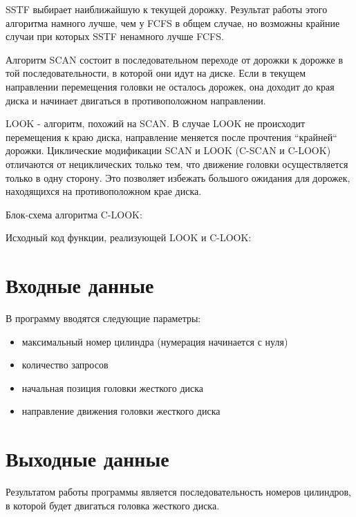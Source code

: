 \documentclass[a4paper,10pt,oneside]{article}
\begin{document}
SSTF выбирает наиближайшую к текущей дорожку. Результат работы этого алгоритма намного лучше, чем у FCFS в общем случае, но возможны крайние случаи при которых
SSTF ненамного лучше FCFS.

Алгоритм SCAN состоит в последовательном переходе от дорожки к дорожке в той последовательности, в которой они идут на диске. Если в текущем направлении перемещения
головки не осталось дорожек, она доходит до края диска и начинает двигаться в противоположном направлении.

LOOK - алгоритм, похожий на SCAN. В случае LOOK не происходит перемещения к краю диска, направление меняется после прочтения ``крайней`` дорожки.
Циклические модификации SCAN и LOOK (C-SCAN и C-LOOK) отличаются от нециклических только тем, что движение головки осуществляется только в одну сторону.
Это позволяет избежать большого ожидания для дорожек, находящихся на противоположном крае диска.

Блок-схема алгоритма C-LOOK:



% 
% 
% 
% 
% 
% 
% 
% 
% 
% 
% 
% 
% 
% 
% 

\pagebreak
Исходный код функции, реализующей LOOK и C-LOOK:

\begin{flushleft}
\texttt{
  
}
\end{flushleft}


\section{Входные данные}
В программу вводятся следующие параметры:
\begin{itemize}
 \item максимальный номер цилиндра (нумерация начинается с нуля)
 \item количество запросов
 \item начальная позиция головки жесткого диска
 \item направление движения головки жесткого диска
\end{itemize}

\section{Выходные данные}
Результатом работы программы является последовательность номеров цилиндров, в которой будет двигаться головка жесткого диска.
\end{document}
